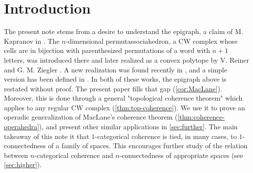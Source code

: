 
\section*{Introduction} 
\label{s:introduction}

The present note stems from a desire to understand the epigraph, a claim of M. Kapranov in \cite{kapranov1993}. 
The $n$-dimensional permutassociahedron, a CW complex whose cells are in bijection with parenthesized permutations of a word with $n+1$ letters, was introduced there and later realized as a convex polytope by V. Reiner and G. M. Ziegler \cite{reinerCoxeterassociahedra1994}. 
A new realization was found recently in \cite{CastilloLiu21}, and a simple version has been defined in \cite{baralicSimplePermutoassociahedron2019}.
In both of these works, the epigraph above is restated without proof. 
The present paper fills that gap (\cref{cor:MacLane}).
Moreover, this is done through a general "topological coherence theorem" which applies to any regular CW complex (\cref{thm:top-coherence}). 
We use it to prove an operadic generalization of MacLane's coherence theorem (\cref{thm:coherence-operahedra}), and present other similar applications in \cref{sec:further}. 
The main takeaway of this note it that $1$-categorical coherence is tied, in many cases, to $1$-connectedness of a family of spaces. 
This encourages further study of the relation between $n$-categorical coherence and $n$-connectedness of appropriate spaces (see \cref{sec:higher}).



